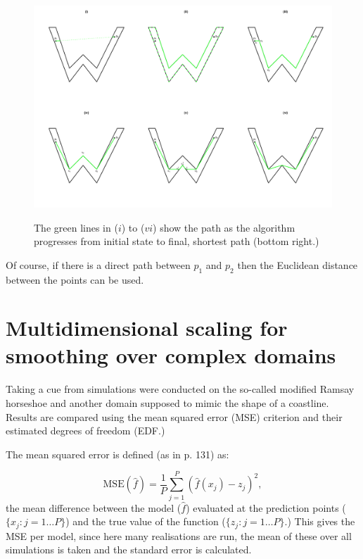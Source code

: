 \documentclass[a4paper,10pt]{article}
\begin{document}
\begin{figure}
\centering
\includegraphics[trim=0in 0.5in 0in 0.25in, width=9.5in]{figs/wdia.pdf} \\
\caption{The green lines in ($i$) to ($vi$) show the path as the algorithm progresses from initial state to final, shortest path (bottom right.) }
\label{wdia}
\end{figure}

Of course, if there is a direct path between $p_1$ and $p_2$ then the Euclidean distance between the points can be used.

\section{Multidimensional scaling for smoothing over complex domains}

Taking a cue from \cite{soap} simulations were conducted on the so-called modified Ramsay horseshoe and another domain supposed to mimic the shape of a coastline. Results are compared using the mean squared error (MSE) criterion and their estimated degrees of freedom (EDF.)

The mean squared error is defined (as in \cite{simonbook} p. 131) as:

\begin{equation}
\text{MSE}(\hat{f}) = \frac{1}{P} \sum_{j=1}^P (\hat{f}(x_j) - z_j)^2,
\end{equation}
the mean difference between the model ($\hat{f}$) evaluated at the prediction points ($\{x_j : j=1 \dots P\}$) and the true value of the function ($\{z_j : j=1 \dots P\}$.) This gives the MSE per model, since here many realisations are run, the mean of these over all simulations is taken and the standard error is calculated.
\end{document}
